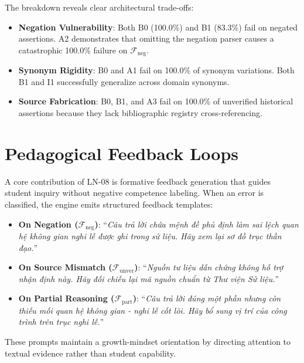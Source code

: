 \documentclass[11pt,a4paper]{article}
\begin{document}


The breakdown reveals clear architectural trade-offs:
\begin{itemize}[leftmargin=*]
    \item \textbf{Negation Vulnerability}: Both B0 (100.0\%) and B1 (83.3\%) fail on negated assertions. A2 demonstrates that omitting the negation parser causes a catastrophic 100.0\% failure on $\mathcal{F}_{\text{neg}}$.
    \item \textbf{Synonym Rigidity}: B0 and A1 fail on 100.0\% of synonym variations. Both B1 and I1 successfully generalize across domain synonyms.
    \item \textbf{Source Fabrication}: B0, B1, and A3 fail on 100.0\% of unverified historical assertions because they lack bibliographic registry cross-referencing.
\end{itemize}

\section{Pedagogical Feedback Loops}
A core contribution of LN-08 is formative feedback generation that guides student inquiry without negative competence labeling. When an error is classified, the engine emits structured feedback templates:
\begin{itemize}[leftmargin=*]
    \item \textbf{On Negation ($\mathcal{F}_{\text{neg}}$)}: ``\textit{Câu trả lời chứa mệnh đề phủ định làm sai lệch quan hệ không gian nghi lễ được ghi trong sử liệu. Hãy xem lại sơ đồ trục thần đạo.}''
    \item \textbf{On Source Mismatch ($\mathcal{F}_{\text{unver}}$)}: ``\textit{Nguồn tư liệu dẫn chứng không hỗ trợ nhận định này. Hãy đối chiếu lại mã nguồn chuẩn từ Thư viện Sử liệu.}''
    \item \textbf{On Partial Reasoning ($\mathcal{F}_{\text{part}}$)}: ``\textit{Câu trả lời đúng một phần nhưng còn thiếu mối quan hệ không gian - nghi lễ cốt lõi. Hãy bổ sung vị trí của công trình trên trục nghi lễ.}''
\end{itemize}
These prompts maintain a growth-mindset orientation by directing attention to textual evidence rather than student capability.
\end{document}
